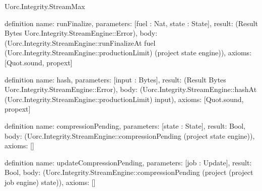\begin{lexlean}{Uorc.Integrity.StreamMax}
\begin{semanticmodule}
definition{
  name: runFinalize,
  parameters: [fuel : Nat, state : State],
  result: (Result Bytes Uorc.Integrity.StreamEngine::Error),
  body: (Uorc.Integrity.StreamEngine::runFinalizeAt fuel (Uorc.Integrity.StreamEngine::productionLimit) (project state engine)),
  axioms: [Quot.sound, propext]
}

definition{
  name: hash,
  parameters: [input : Bytes],
  result: (Result Bytes Uorc.Integrity.StreamEngine::Error),
  body: (Uorc.Integrity.StreamEngine::hashAt (Uorc.Integrity.StreamEngine::productionLimit) input),
  axioms: [Quot.sound, propext]
}

definition{
  name: compressionPending,
  parameters: [state : State],
  result: Bool,
  body: (Uorc.Integrity.StreamEngine::compressionPending (project state engine)),
  axioms: []
}

definition{
  name: updateCompressionPending,
  parameters: [job : Update],
  result: Bool,
  body: (Uorc.Integrity.StreamEngine::compressionPending (project (project job engine) state)),
  axioms: []
}
\end{semanticmodule}
\end{lexlean}
